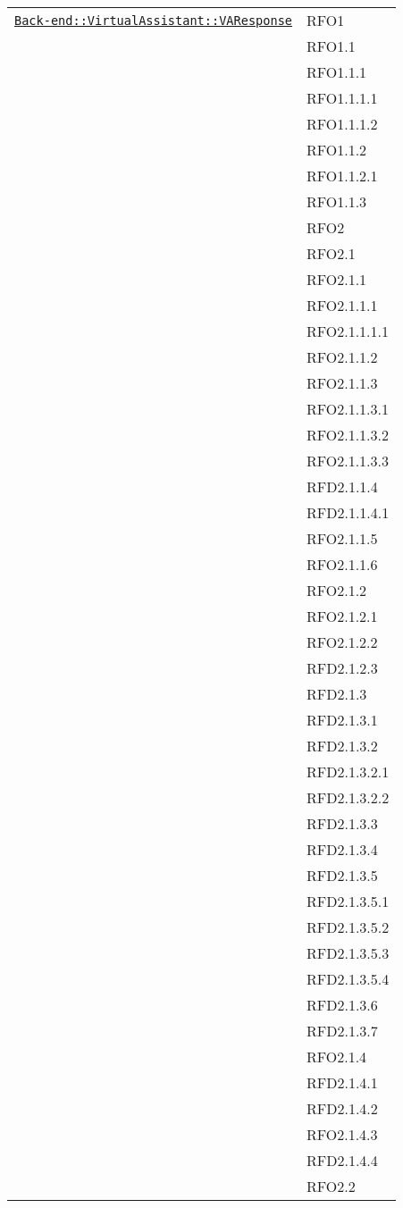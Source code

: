 \begin{longtable}{|>{\centering}m{10cm}|m{3cm}<{\centering}|}
\hyperref[Back-end::VirtualAssistant::VAResponse]{\texttt{Back-end::VirtualAssistant::VAResponse}} & RFO1\\
& RFO1.1\\
& RFO1.1.1\\
& RFO1.1.1.1\\
& RFO1.1.1.2\\
& RFO1.1.2\\
& RFO1.1.2.1\\
& RFO1.1.3\\
& RFO2\\
& RFO2.1\\
& RFO2.1.1\\
& RFO2.1.1.1\\
& RFO2.1.1.1.1\\
& RFO2.1.1.2\\
& RFO2.1.1.3\\
& RFO2.1.1.3.1\\
& RFO2.1.1.3.2\\
& RFO2.1.1.3.3\\
& RFD2.1.1.4\\
& RFD2.1.1.4.1\\
& RFO2.1.1.5\\
& RFO2.1.1.6\\
& RFO2.1.2\\
& RFO2.1.2.1\\
& RFO2.1.2.2\\
& RFD2.1.2.3\\
& RFD2.1.3\\
& RFD2.1.3.1\\
& RFD2.1.3.2\\
& RFD2.1.3.2.1\\
& RFD2.1.3.2.2\\
& RFD2.1.3.3\\
& RFD2.1.3.4\\
& RFD2.1.3.5\\
& RFD2.1.3.5.1\\
& RFD2.1.3.5.2\\
& RFD2.1.3.5.3\\
& RFD2.1.3.5.4\\
& RFD2.1.3.6\\
& RFD2.1.3.7\\
& RFO2.1.4\\
& RFD2.1.4.1\\
& RFD2.1.4.2\\
& RFO2.1.4.3\\
& RFD2.1.4.4\\
& RFO2.2\\

\end{longtable}
